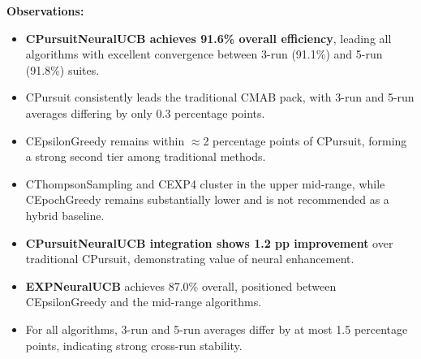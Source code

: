 \documentclass[12pt,a4paper]{article}
\newcommand{\legacy}[1]{\textcolor{legacycolor}{\textbf{#1}}}
\newcommand{\neural}[1]{\textcolor{neuralcolor}{\textbf{#1}}}
\begin{document}
\begin{tcolorbox}[colback=performancecolor!10,colframe=performancecolor,title=\textbf{Primary Performance Results (Aggregated Across Capacities, Environments, and Regimes)}]
\textbf{Observations:}
\begin{itemize}
\item \neural{CPursuitNeuralUCB achieves 91.6\% overall efficiency}, leading all algorithms with excellent convergence between 3-run (91.1\%) and 5-run (91.8\%) suites.
\item CPursuit consistently leads the traditional CMAB pack, with 3-run and 5-run averages differing by only 0.3 percentage points.
\item CEpsilonGreedy remains within $\approx$2 percentage points of CPursuit, forming a strong second tier among traditional methods.
\item CThompsonSampling and CEXP4 cluster in the upper mid-range, while CEpochGreedy remains substantially lower and is not recommended as a hybrid baseline.
\item \neural{CPursuitNeuralUCB integration shows 1.2 pp improvement} over traditional CPursuit, demonstrating value of neural enhancement.
\item \legacy{EXPNeuralUCB} achieves 87.0\% overall, positioned between CEpsilonGreedy and the mid-range algorithms.
\item For all algorithms, 3-run and 5-run averages differ by at most 1.5 percentage points, indicating strong cross-run stability.
\end{itemize}

\end{tcolorbox}
\end{document}
